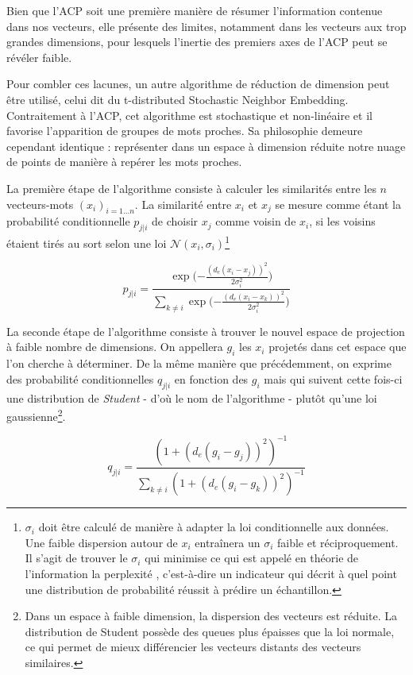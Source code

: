 \documentclass[11pt,french,french]{article}
\let\rmarkdownfootnote\footnote%
\def\footnote{\protect\rmarkdownfootnote}
\begin{document}
Bien que l'ACP soit une première manière de résumer l'information
contenue dans nos vecteurs, elle présente des limites, notamment dans
les vecteurs aux trop grandes dimensions, pour lesquels l'inertie des
premiers axes de l'ACP peut se révéler faible.

Pour combler ces lacunes, un autre algorithme de réduction de dimension
peut être utilisé, celui dit du t-distributed Stochastic Neighbor
Embedding. Contraitement à l'ACP, cet algorithme est stochastique et
non-linéaire et il favorise l'apparition de groupes de mots proches. Sa
philosophie demeure cependant identique : représenter dans un espace à
dimension réduite notre nuage de points de manière à repérer les mots
proches.

La première étape de l'algorithme consiste à calculer les similarités
entre les \(n\) vecteurs-mots \((x_i)_{i=1...n}\). La similarité entre
\(x_i\) et \(x_j\) se mesure comme étant la probabilité conditionnelle
\(p_{j|i}\) de choisir \(x_j\) comme voisin de \(x_i\), si les voisins
étaient tirés au sort selon une loi
\(\mathcal{N}(x_i, \sigma_i)\)\footnote{\(\sigma_i\) doit être calculé
  de manière à adapter la loi conditionnelle aux données. Une faible
  dispersion autour de \(x_i\) entraînera un \(\sigma_i\) faible et
  réciproquement. Il s'agit de trouver le \(\sigma_i\) qui minimise ce
  qui est appelé en théorie de l'information la \og perplexité \fg,
  c'est-à-dire un indicateur qui décrit à quel point une distribution de
  probabilité réussit à prédire un échantillon.}

\[ p_{j|i} = \frac{\exp({-\frac{(d_e(x_i - x_j))^2}{2\sigma_i^2})}}{\sum_{k \neq i}{\exp({-\frac{(d_e(x_i - x_k))^2}{2\sigma_i^2})}}}\]

La seconde étape de l'algorithme consiste à trouver le nouvel espace de
projection à faible nombre de dimensions. On appellera \(g_i\) les
\(x_i\) projetés dans cet espace que l'on cherche à déterminer. De la
même manière que précédemment, on exprime des probabilité
conditionnelles \(q_{j|i}\) en fonction des \(g_i\) mais qui suivent
cette fois-ci une distribution de \emph{Student} - d'où le nom de
l'algorithme - plutôt qu'une loi gaussienne\footnote{Dans un espace à
  faible dimension, la dispersion des vecteurs est réduite. La
  distribution de Student possède des queues plus épaisses que la loi
  normale, ce qui permet de mieux différencier les vecteurs distants des
  vecteurs similaires.}.

\[ q_{j|i} = \frac{(1+ (d_e(g_i - g_j))^2)^{-1}}{\sum_{k \neq i}{(1+ (d_e(g_i - g_k))^2)^{-1}}}\]
\end{document}
